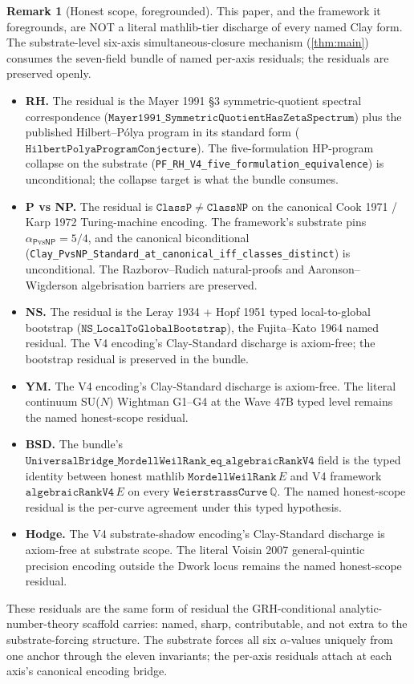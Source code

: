 \documentclass[11pt,a4paper]{article}
\theoremstyle{plain}
\theoremstyle{definition}
\newtheorem{remark}[theorem]{Remark}
\begin{document}
\begin{remark}[Honest scope, foregrounded]
\label{rem:honest-scope}
This paper, and the framework it foregrounds, are NOT a literal
mathlib-tier discharge of every named Clay form. The
substrate-level six-axis simultaneous-closure mechanism
(\cref{thm:main}) consumes the seven-field bundle of named
per-axis residuals; the residuals are preserved openly.

\begin{itemize}[leftmargin=*,nosep]
\item \textbf{RH.} The residual is the Mayer 1991 \S3
  symmetric-quotient spectral correspondence
  ($\mathtt{Mayer1991\_SymmetricQuotientHasZetaSpectrum}$) plus the
  published Hilbert--P\'olya program in its standard form
  ($\mathtt{HilbertPolyaProgramConjecture}$). The five-formulation
  HP-program collapse on the substrate
  (\texttt{PF\_RH\_V4\_five\_formulation\_equivalence}) is
  unconditional; the collapse target is what the bundle consumes.
\item \textbf{P vs NP.} The residual is
  $\mathtt{ClassP} \neq \mathtt{ClassNP}$ on the canonical Cook 1971
  / Karp 1972 Turing-machine encoding. The framework's substrate
  pins $\alpha_{\mathsf{P}\mathrm{vs}\mathsf{NP}} = 5/4$, and the
  canonical biconditional
  (\texttt{Clay\_PvsNP\_Standard\_at\_canonical\_iff\_classes\_distinct})
  is unconditional. The Razborov--Rudich natural-proofs and
  Aaronson--Wigderson algebrisation barriers are preserved.
\item \textbf{NS.} The residual is the Leray 1934 + Hopf 1951 typed
  local-to-global bootstrap
  ($\mathtt{NS\_LocalToGlobalBootstrap}$), the Fujita--Kato 1964
  named residual. The V4 encoding's Clay-Standard discharge is
  axiom-free; the bootstrap residual is preserved in the bundle.
\item \textbf{YM.} The V4 encoding's Clay-Standard discharge is
  axiom-free. The literal continuum SU($N$) Wightman G1--G4 at the
  Wave 47B typed level remains the named honest-scope residual.
\item \textbf{BSD.} The bundle's
  $\mathtt{UniversalBridge\_MordellWeilRank\_eq\_algebraicRankV4}$
  field is the typed identity between honest mathlib
  $\mathtt{MordellWeilRank}\, E$ and V4 framework
  $\mathtt{algebraicRankV4}\, E$ on every
  $\mathtt{WeierstrassCurve}\, \mathbb{Q}$. The named honest-scope
  residual is the per-curve agreement under this typed hypothesis.
\item \textbf{Hodge.} The V4 substrate-shadow encoding's
  Clay-Standard discharge is axiom-free at substrate scope. The
  literal Voisin 2007 general-quintic precision encoding outside
  the Dwork locus remains the named honest-scope residual.
\end{itemize}

These residuals are the same form of residual the GRH-conditional
analytic-number-theory scaffold carries: named, sharp, contributable,
and not extra to the substrate-forcing structure. The substrate
forces all six $\alpha$-values uniquely from one anchor through the
eleven invariants; the per-axis residuals attach at each axis's
canonical encoding bridge.
\end{remark}
\end{document}
